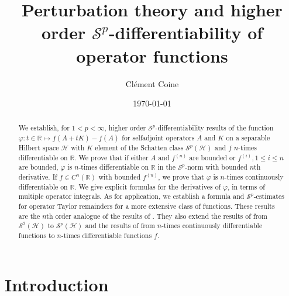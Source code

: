 \documentclass[12pt]{amsart}
\theoremstyle{remark}
\def\Sc{{\mathcal{S}}}
\begin{document}
\title[Perturbation theory and higher order $\Sc^p$-differentiability of operator functions]
{Perturbation theory and higher order $\Sc^p$-differentiability of operator functions}

\author[C. Coine]{Cl\'ement Coine}


\address{School of Mathematics and Statistics, Central South University, Changsha 410085,
People’s Republic of China}



\date{\today}


\maketitle




\begin{abstract}
We establish, for $1 < p < \infty$, higher order $\mathcal{S}^p$-differentiability results of the function $\varphi : t\in \mathbb{R} \mapsto f(A+tK) - f(A)$ for selfadjoint operators $A$ and $K$ on a separable Hilbert space $\mathcal{H}$ with $K$ element of the Schatten class $\mathcal{S}^p(\mathcal{H})$ and $f$ $n$-times differentiable on $\mathbb{R}$. We prove that if either $A$ and $f^{(n)}$ are bounded or $f^{(i)}, 1 \leq i \leq n$ are bounded, $\varphi$ is $n$-times differentiable on $\mathbb{R}$ in the $\mathcal{S}^p$-norm with bounded $n$th derivative. If $f\in C^n(\mathbb{R})$ with bounded $f^{(n)}$, we prove that $\varphi$ is $n$-times continuously differentiable on $\mathbb{R}$. We give explicit formulas for the derivatives of $\varphi$, in terms of multiple operator integrals. As for application, we establish a formula and $\mathcal{S}^p$-estimates for operator Taylor remainders for a more extensive class of functions. These results are the $n$th order analogue of the results of \cite{KPSS}. They also extend the results of \cite{CLSS} from $\mathcal{S}^2(\mathcal{H})$ to $\mathcal{S}^p(\mathcal{H})$ and the results of \cite{LMS} from $n$-times continuously differentiable functions to $n$-times differentiable functions $f$.
\end{abstract}




\section{Introduction}
\end{document}
